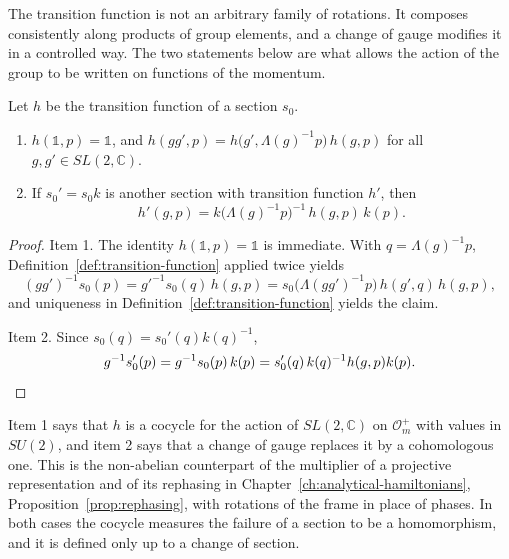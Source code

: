 The transition function is not an arbitrary family of rotations. It composes consistently along products of group elements, and a change of gauge modifies it in a controlled way. The two statements below are what allows the action of the group to be written on functions of the momentum.

\begin{lemma}\label{lem:transition-cocycle}
	Let $h$ be the transition function of a section $s_0$.
	\begin{enumerate}
		\item $h(\mathbb{1},p)=\mathbb{1}$, and $h(gg',p)=h\big(g',\Lambda(g)^{-1}p\big)\,h(g,p)$ for all $g,g'\in SL(2,\mathbb{C})$.
		\item If $s_0'=s_0k$ is another section with transition function $h'$, then
		\begin{equation*}
			h'(g,p)=k\big(\Lambda(g)^{-1}p\big)^{-1}\,h(g,p)\,k(p).
		\end{equation*}
	\end{enumerate}
\end{lemma}

\begin{proof}
	Item 1. The identity $h(\mathbb{1},p)=\mathbb{1}$ is immediate. With $q=\Lambda(g)^{-1}p$, Definition~\ref{def:transition-function} applied twice yields
	\begin{equation*}
		(gg')^{-1}s_0(p)=g'^{-1}s_0(q)\,h(g,p)=s_0\big(\Lambda(gg')^{-1}p\big)\,h(g',q)\,h(g,p),
	\end{equation*}
	and uniqueness in Definition~\ref{def:transition-function} yields the claim.
	
	Item 2. Since $s_0(q)=s_0'(q)k(q)^{-1}$,
	\begin{equation*}
		g^{-1}s_0'(p)=g^{-1}s_0(p)\,k(p)=s_0'(q)\,k(q)^{-1}h(g,p)k(p).\qedhere
	\end{equation*}
\end{proof}

\begin{remark}
	Item 1 says that $h$ is a cocycle for the action of $SL(2,\mathbb{C})$ on $\mathcal{O}_m^+$ with values in $SU(2)$, and item 2 says that a change of gauge replaces it by a cohomologous one. This is the non-abelian counterpart of the multiplier of a projective representation and of its rephasing in Chapter~\ref{ch:analytical-hamiltonians}, Proposition~\ref{prop:rephasing}, with rotations of the frame in place of phases. In both cases the cocycle measures the failure of a section to be a homomorphism, and it is defined only up to a change of section.
\end{remark}


